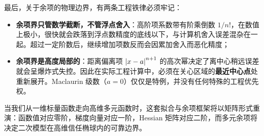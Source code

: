 最后，关于余项的物理边界，有两条工程铁律必须牢记：
\begin{itemize}
    \item \textbf{余项界只管数学截断，不管浮点舍入}：高阶项系数带有阶乘倒数 \(1/n!\)，在数值上极小，很快就会跌落到浮点数精度的底线以下，与计算机舍入误差混杂在一起。超过一定阶数后，继续增加项数反而会因累加舍入而恶化精度；
    \item \textbf{余项界是高度局部的}：距离偏离项 \(\left|x-a\right|^{n+1}\) 的高次幂决定了离中心稍远误差就会呈爆炸式失控。因此在实际工程计算中，必须在关心区域的\textbf{最近中心点}处重新展开。Maclaurin 级数（\(a=0\)）仅仅是特例，并没有任何特殊的工程优先权。
\end{itemize}

当我们从一维标量函数走向高维多元函数时，这套拟合与余项框架将以矩阵形式重演：函数值对应零阶，梯度向量对应一阶，Hessian 矩阵对应二阶，而多元余项将决定二次模型在高维信任椭球内的可靠边界。
